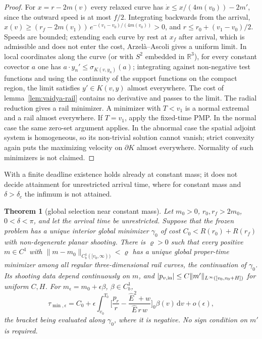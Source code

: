 \documentclass[aip,jmp,amsmath,amssymb,reprint]{revtex4-2}
\newcommand{\Ehat}{\hat E}
\newcommand{\dd}{\mathrm{d}}
\theoremstyle{plain}
\newtheorem{theorem}{Theorem}
\theoremstyle{definition}
\begin{document}
\begin{proof}
For $x=r-2m(v)$ every relaxed curve has $\dot x\le x/(4m(v_0))-2m'$, since the outward speed is
at most $f/2$. Integrating backwards from the arrival,
$x(v)\ge(r_f-2m(v_1))\,e^{-(v_1-v_0)/(4m(v_0))}>0$, and $r\le r_0+(v_1-v_0)/2$. Speeds are bounded;
extending each curve by rest at $x_f$ after arrival, which is admissible and does not enter
the cost, Arzel\`a--Ascoli gives a uniform limit. In local coordinates along the curve (or
with $S^2$ embedded in $\mathbb R^3$), for every constant covector $a$ one has
$a\cdot y_n'\le\sigma_{K(v,y_n)}(a)$; integrating against non-negative test functions and using
the continuity of the support functions on the compact region, the limit satisfies
$y'\in K(v,y)$ almost everywhere. The cost of lemma~\ref{lem:vaidya-rail} contains no derivative
and passes to the limit. The radial reduction gives a rail minimizer. A minimizer with
$T<v_1$ is a normal extremal and a rail almost everywhere. If $T=v_1$, apply the fixed-time PMP.
In the normal case the same zero-set argument applies. In the abnormal case the spatial
adjoint system is homogeneous, so its non-trivial solution cannot vanish; strict convexity
again puts the maximizing velocity on $\partial K$ almost everywhere. Normality of such
minimizers is not claimed.
\end{proof}

With a finite deadline existence holds already at constant mass; it does not decide
attainment for unrestricted arrival time, where for constant mass and $\delta>\delta_c$ the
infimum is not attained.

\begin{theorem}[global selection near constant mass]\label{thm:vaidya-P}
Let $m_0>0$, $r_0,r_f>2m_0$, $0<\delta<\pi$, and let the arrival time be unrestricted.
Suppose that the frozen problem has a unique interior global minimizer $\gamma_0$ of cost
$C_0<R(r_0)+R(r_f)$ with non-degenerate planar shooting. There is $\varrho>0$ such that every
positive $m\in C^1$ with $\|m-m_0\|_{C^1_b([v_0,\infty))}<\varrho$ has a unique global proper-time
minimizer among all regular three-dimensional rail curves, the continuation of $\gamma_0$.
Its shooting data depend continuously on $m$, and
$|p_{v,{\rm in}}|\le C\|m'\|_{L^\infty([v_0,v_0+H])}$ for uniform $C,H$. For $m_\epsilon=m_0+\epsilon\beta$,
$\beta\in C^1_b$,
\[
  \tau_{\min,\epsilon}=C_0+\epsilon\int_{v_0}^{T_0}
  \Big[\frac{p_r}{r}-\frac{\Ehat^2+w}{\Ehat\,r\,w}\Big]_0\beta(v)\,\dd v+o(\epsilon),
\]
the bracket being evaluated along $\gamma_0$, where it is negative. No sign condition on $m'$ is
required.
\end{theorem}
\end{document}
